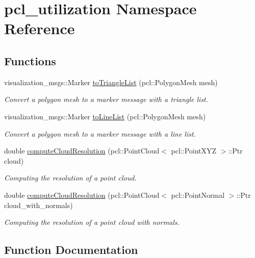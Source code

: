 \hypertarget{namespacepcl__utilization}{}\section{pcl\+\_\+utilization Namespace Reference}
\label{namespacepcl__utilization}
\subsection*{Functions}
\begin{DoxyCompactItemize}
\item 
visualization\+\_\+msgs\+::\+Marker \hyperlink{namespacepcl__utilization_a051f0954371074c7331ba054d185950f}{to\+Triangle\+List} (pcl\+::\+Polygon\+Mesh mesh)
\begin{DoxyCompactList}\small\item\em Convert a polygon mesh to a marker message with a triangle list. \end{DoxyCompactList}\item 
visualization\+\_\+msgs\+::\+Marker \hyperlink{namespacepcl__utilization_a1a3ffc60b638c2a551b02ba9a755d3f1}{to\+Line\+List} (pcl\+::\+Polygon\+Mesh mesh)
\begin{DoxyCompactList}\small\item\em Convert a polygon mesh to a marker message with a line list. \end{DoxyCompactList}\item 
double \hyperlink{namespacepcl__utilization_ac199fc2120c5dce78fd87c2c1e0445d0}{compute\+Cloud\+Resolution} (pcl\+::\+Point\+Cloud$<$ pcl\+::\+Point\+X\+YZ $>$\+::Ptr cloud)
\begin{DoxyCompactList}\small\item\em Computing the resolution of a point cloud. \end{DoxyCompactList}\item 
double \hyperlink{namespacepcl__utilization_a5fd7d53d77802f39bdec1098137e198a}{compute\+Cloud\+Resolution} (pcl\+::\+Point\+Cloud$<$ pcl\+::\+Point\+Normal $>$\+::Ptr cloud\+\_\+with\+\_\+normals)
\begin{DoxyCompactList}\small\item\em Computing the resolution of a point cloud with normals. \end{DoxyCompactList}\end{DoxyCompactItemize}


\subsection{Function Documentation}
